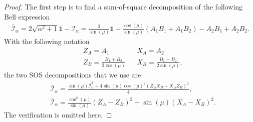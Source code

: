 \documentclass[11pt,letterpaper]{article}
\newcommand{\1}{\mathbb{1}}
\newcommand{\I}{\mathcal{I}}
\theoremstyle{definition}
\begin{document}
\begin{proof}
The first step is to find a sum-of-square decomposition of 
the following Bell expression
\begin{align}
	\bar{\I}_\alpha = 2\sqrt{\alpha^2+1} \1 - \I_\alpha
	= \frac{2}{\sin(\mu)} \1 - \frac{\cos(\mu)}{\sin(\mu)}(A_1B_1+A_1B_2) -  A_2B_1 + A_2B_2.
\end{align} 
With the following notation
\begin{align*}
	&Z_A = A_1 && X_A = A_2\\
	&Z_B = \frac{B_1+B_2}{2\cos(\mu)} && X_B = \frac{B_1-B_2}{2\sin(\mu)},
\end{align*}
the two SOS decompositions that we use are
\begin{align}
	\label{eq:sos1}&\bar{\I}_\alpha = \frac{\sin(\mu)\bar{\I}_\alpha^2 + 4\sin(\mu)\cos(\mu)^2(Z_AX_B+X_AZ_B)^2}{4},\\
	\label{eq:sos2}&\bar{\I}_\alpha = \frac{\cos^2(\mu)}{\sin(\mu)}(Z_A-Z_B)^2 + \sin(\mu) (X_A-X_B)^2.
\end{align}
The verification is omitted here.


\end{proof}
\end{document}
